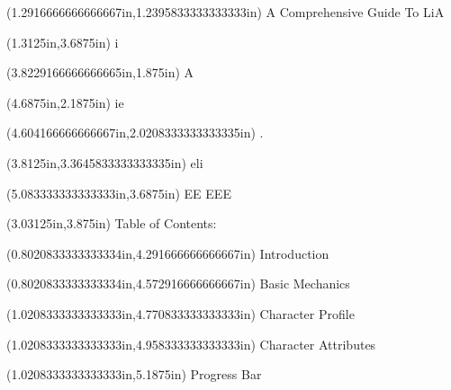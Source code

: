 \documentclass{article}
\begin{document}
\begin{textblock*}{8.0in}(1.2916666666666667in,1.2395833333333333in)
\fontsize{24.00}{28.80}\selectfont
A Comprehensive Guide To LiA
\end{textblock*}
\begin{textblock*}{8.0in}(1.3125in,3.6875in)
\fontsize{141.00}{169.20}  i
\end{textblock*}
\begin{textblock*}{8.0in}(3.8229166666666665in,1.875in)
\fontsize{6.00}{7.20}\selectfont
A
\end{textblock*}
\begin{textblock*}{8.0in}(4.6875in,2.1875in)
\fontsize{17.25}{20.70}\selectfont
ie
\end{textblock*}
\begin{textblock*}{8.0in}(4.604166666666667in,2.0208333333333335in)
\fontsize{2.25}{2.70}\selectfont
.
\end{textblock*}
\begin{textblock*}{8.0in}(3.8125in,3.3645833333333335in)
\fontsize{78.00}{93.60}\selectfont
eli
\end{textblock*}
\begin{textblock*}{8.0in}(5.083333333333333in,3.6875in)
\fontsize{3.00}{3.60}\selectfont
EE EEE
\end{textblock*}
\begin{textblock*}{8.0in}(3.03125in,3.875in)
\fontsize{11.25}{13.50}\selectfont
Table of Contents:
\end{textblock*}
\begin{textblock*}{8.0in}(0.8020833333333334in,4.291666666666667in)
\fontsize{10.50}{12.60}\selectfont
Introduction
\end{textblock*}
\begin{textblock*}{8.0in}(0.8020833333333334in,4.572916666666667in)
\fontsize{10.50}{12.60}\selectfont
Basic Mechanics
\end{textblock*}
\begin{textblock*}{8.0in}(1.0208333333333333in,4.770833333333333in)
\fontsize{10.50}{12.60}\selectfont
Character Profile
\end{textblock*}
\begin{textblock*}{8.0in}(1.0208333333333333in,4.958333333333333in)
\fontsize{10.50}{12.60}\selectfont
Character Attributes
\end{textblock*}
\begin{textblock*}{8.0in}(1.0208333333333333in,5.1875in)
\fontsize{12.75}{15.30}\selectfont
Progress Bar
\end{textblock*}
\end{document}
